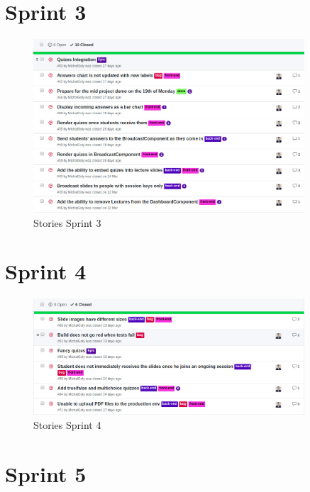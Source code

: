 \newpage
\section{Sprint 3}
\begin{figure}[ht]
    \centering
    \includegraphics[width=0.9\textwidth]{Appendix3/3.jpg}
    \caption{Stories Sprint 3}
    \label{fig:sprintstories3}
\end{figure}

\section{Sprint 4}
\begin{figure}[h!]
    \centering
    \includegraphics[width=0.9\textwidth]{Appendix3/4.jpg}
    \caption{Stories Sprint 4}
    \label{fig:sprintstories4}
\end{figure}

\section{Sprint 5}
